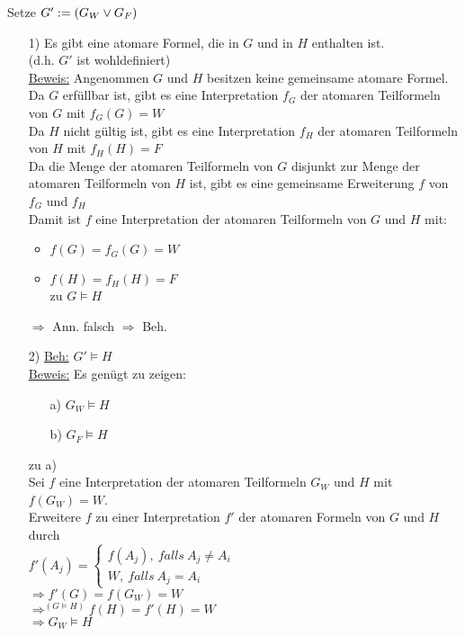 \noindent
Setze $G' := (G_W \vee G_F)$
\begin{enumerate}
\item[1)] Es gibt eine atomare Formel, die in $G$ und in $H$ enthalten ist.\\
(d.h. $G'$ ist wohldefiniert)\\
\underline{Beweis:} Angenommen $G$ und $H$ besitzen keine gemeinsame atomare Formel.\\
Da $G$ erfüllbar ist, gibt es eine Interpretation $f_G$ der atomaren Teilformeln von $G$ mit $f_G (G) = W$\\
Da $H$ nicht gültig ist, gibt es eine Interpretation $f_H$ der atomaren Teilformeln von $H$ mit $f_H (H) = F$\\
Da die Menge der atomaren Teilformeln von $G$ disjunkt zur Menge der atomaren Teilformeln von $H$ ist, gibt es eine gemeinsame Erweiterung $f$ von $f_G$ und $f_H$\\
Damit ist $f$ eine Interpretation der atomaren Teilformeln von $G$ und $H$ mit:
\begin{itemize}
\item $f(G) = f_G(G) = W$
\item $f(H) = f_H(H) = F$\\ \widerspruch zu $G \models H$
\end{itemize}
$\Rightarrow$ Ann. falsch $\Rightarrow$ Beh.

\item[2)] \underline{Beh:} $G' \models H$ \\
\underline{Beweis:} Es genügt zu zeigen:
\begin{enumerate}
\item[a)] $G_W \models H$
\item[b)] $G_F \models H$
\end{enumerate}

zu a)\\
Sei $f$ eine Interpretation der atomaren Teilformeln $G_W$ und $H$ mit $f(G_W) = W$.\\
Erweitere $f$ zu einer Interpretation $f'$ der atomaren Formeln von $G$ und $H$ durch\\
$f'(A_j) = \begin{cases} f(A_j),\ falls\ A_j \neq A_i \\ W,\ falls\ A_j = A_i \end{cases}$\\
$\Rightarrow f'(G) = f(G_W) = W$\\
$\Rightarrow^{(G \models H)} f(H) = f'(H) = W$\\
$\Rightarrow G_W \models H$\\


\end{enumerate}
